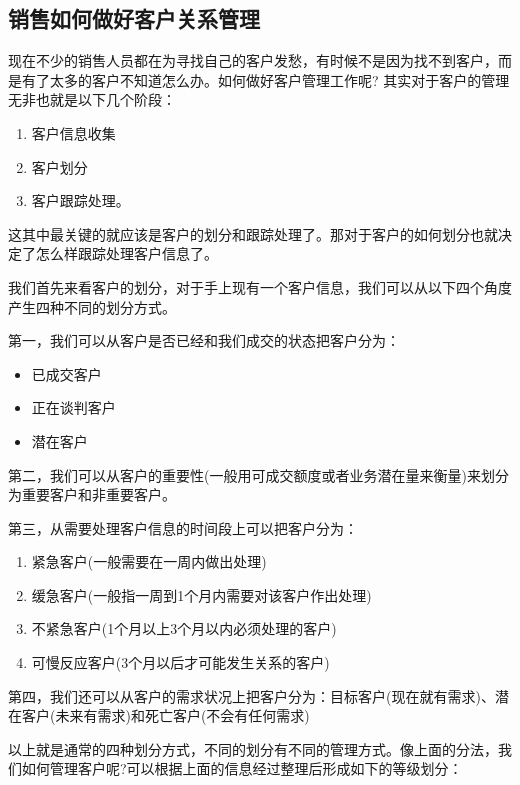 \subsection { 销售如何做好客户关系管理}

    现在不少的销售人员都在为寻找自己的客户发愁，有时候不是因为找不到客户，而是有了太多的客户不知道怎么办。如何做好客户管理工作呢?   其实对于客户的管理无非也就是以下几个阶段：
      \begin{enumerate}
      \item 客户信息收集
      \item 客户划分
      \item 客户跟踪处理。
        \end{enumerate}

    这其中最关键的就应该是客户的划分和跟踪处理了。那对于客户的如何划分也就决定了怎么样跟踪处理客户信息了。

    我们首先来看客户的划分，对于手上现有一个客户信息，我们可以从以下四个角度产生四种不同的划分方式。

    第一，我们可以从客户是否已经和我们成交的状态把客户分为：
        \begin{itemize}
            \item 已成交客户
            \item 正在谈判客户
            \item 潜在客户
        \end{itemize}

    第二，我们可以从客户的重要性(一般用可成交额度或者业务潜在量来衡量)来划分为重要客户和非重要客户。

    第三，从需要处理客户信息的时间段上可以把客户分为：

    \begin{enumerate}
        \item 紧急客户(一般需要在一周内做出处理)
        \item 缓急客户(一般指一周到1个月内需要对该客户作出处理)
        \item 不紧急客户(1个月以上3个月以内必须处理的客户)
        \item 可慢反应客户(3个月以后才可能发生关系的客户)
    \end{enumerate}

    第四，我们还可以从客户的需求状况上把客户分为：目标客户(现在就有需求)、潜在客户(未来有需求)和死亡客户(不会有任何需求)

    以上就是通常的四种划分方式，不同的划分有不同的管理方式。像上面的分法，我们如何管理客户呢?可以根据上面的信息经过整理后形成如下的等级划分：

